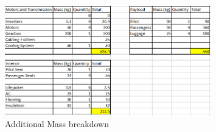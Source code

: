 \documentclass[11pt,a4paper]{article}
\begin{document}
\begin{appendices}
\begin{figure}[H]
    \centering
    \includegraphics[width=0.8\textwidth]{massbreak.PNG}
    \caption{Additional Mass breakdown}
    \label{fig:massb2}
\end{figure}{}

%
%

\end{appendices}
\end{document}
